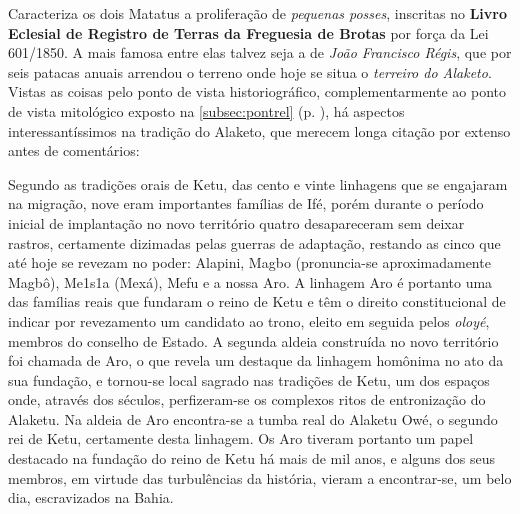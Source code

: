 Caracteriza os dois Matatus a proliferação de \textit{pequenas posses}, inscritas no \textbf{Livro Eclesial de Registro de Terras da Freguesia de Brotas} por força da Lei 601/1850. A mais famosa entre elas talvez seja a de \textit{João Francisco Régis}, que por seis patacas anuais arrendou o terreno onde hoje se situa o \textit{terreiro do Alaketo}. Vistas as coisas pelo ponto de vista historiográfico, complementarmente ao ponto de vista mitológico exposto na \autoref{subsec:pontrel} (p. \pageref{subsec:pontrel}), há aspectos interessantíssimos na tradição do Alaketo, que merecem longa citação por extenso antes de comentários:

\begin{citacao}
Segundo as tradições orais de Ketu, das cento e vinte linhagens que se engajaram na migração, nove eram importantes famílias de Ifé, porém durante o período inicial de implantação no novo território quatro desapareceram sem deixar rastros, certamente dizimadas pelas guerras de adaptação, restando as cinco que até hoje se revezam no poder: Alapini, Magbo (pronuncia-se aproximadamente Magbô), Me1s1a (Mexá), Mefu e a nossa Aro. A linhagem Aro é portanto uma das famílias reais que fundaram o reino de Ketu e têm o direito constitucional de indicar por revezamento um candidato ao trono, eleito em seguida pelos \textit{oloyé}, membros do conselho de Estado. A segunda aldeia construída no novo território foi chamada de Aro, o que revela um destaque da linhagem homônima no ato da sua fundação, e tornou-se local sagrado nas tradições de Ketu, um dos espaços onde, através dos séculos, perfizeram-se os complexos ritos de entronização do Alaketu. Na aldeia de Aro encontra-se a tumba real do Alaketu Owé, o segundo rei de Ketu, certamente desta linhagem. Os Aro tiveram portanto um papel destacado na fundação do reino de Ketu há mais de mil anos, e alguns dos seus membros, em virtude das turbulências da história, vieram a encontrar-se, um belo dia, escravizados na Bahia. 


\end{citacao}
